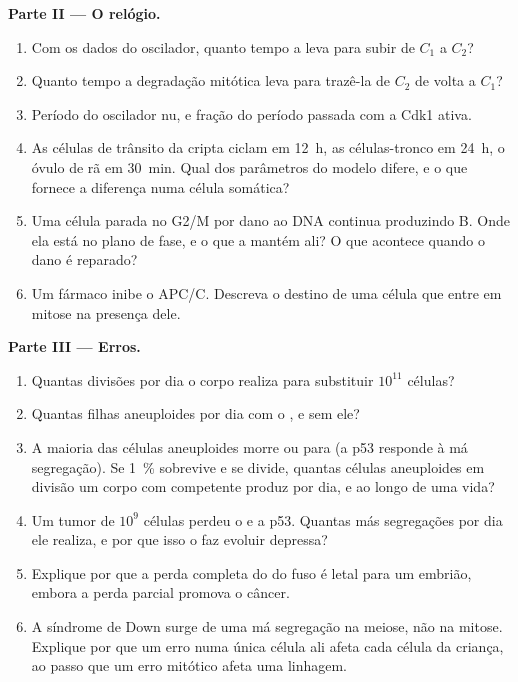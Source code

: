 \begin{problem}
\medskip
\noindent\textbf{Parte II --- O relógio.}
\begin{enumerate}[resume]
  \item Com os dados do oscilador, quanto tempo a  leva para
        subir de $C_{1}$ a $C_{2}$?
  \item Quanto tempo a degradação mitótica leva para trazê-la de
        $C_{2}$ de volta a $C_{1}$?
  \item Período do oscilador nu, e fração do período passada com a Cdk1
        ativa.
  \item As células de trânsito da cripta ciclam em \qty{12}{h}, as
        células-tronco em \qty{24}{h}, o óvulo de rã em \qty{30}{min}.
        Qual dos parâmetros do modelo difere, e o que fornece a
        diferença numa célula somática?
  \item Uma célula parada no  G2/M por dano ao DNA
        continua produzindo  B. Onde ela está no plano de fase, e
        o que a mantém ali? O que acontece quando o dano é reparado?
  \item Um fármaco inibe o APC/C. Descreva o destino de uma célula que
        entre em mitose na presença dele.
\end{enumerate}

\medskip
\noindent\textbf{Parte III --- Erros.}
\begin{enumerate}[resume]
  \item Quantas divisões por dia o corpo realiza para substituir
        $10^{11}$ células?
  \item Quantas filhas aneuploides por dia com o , e
        sem ele?
  \item A maioria das células aneuploides morre ou para (a p53 responde
        à má segregação). Se \qty{1}{\%} sobrevive e se divide, quantas
        células aneuploides em divisão um corpo com 
        competente produz por dia, e ao longo de uma vida?
  \item Um tumor de $10^{9}$ células perdeu o  e a
        p53. Quantas más segregações por dia ele realiza, e por que
        isso o faz evoluir depressa?
  \item Explique por que a perda completa do  do fuso é
        letal para um embrião, embora a perda parcial promova o câncer.
  \item A síndrome de Down surge de uma má segregação na meiose, não na
        mitose. Explique por que um erro numa única célula ali afeta
        cada célula da criança, ao passo que um erro mitótico afeta uma
        linhagem.
\end{enumerate}


\end{problem}
